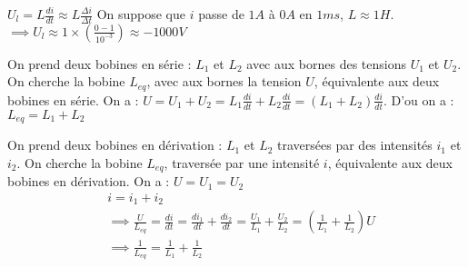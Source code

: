 \begin{center}
\end{center}

\begin{corollary}[Remarque]\label{rem: Rupture du courrant}
    \(U_{l} = L\frac{di}{dt} \approx L \frac{\Delta i}{\Delta t}\) On suppose que \(i\) passe de \(1A\) à \(0A\) en \(1ms\), \(L \approx 1H\). \\
    \( \implies U_{l} \approx 1 \times (\frac{0-1}{10^{-3}}) \approx -1000V \)   
\end{corollary}

\begin{corollary}
    On prend deux bobines en série : \(L_{1}\) et \(L_{2}\) avec aux bornes des tensions \(U_{1}\) et \(U_{2}\). On cherche la bobine \(L_{eq}\), avec aux bornes la tension \(U\), équivalente aux deux bobines en série. On a : \(U = U_{1} + U_{2} = L_{1} \frac{di}{dt}+ L_{2} \frac{di}{dt} = (L_{1}+L_{2})\frac{di}{dt}\). D'ou on a : \(L_{eq} = L_{1}+L_{2}\)    
\end{corollary}

\begin{corollary}
    On prend deux bobines en dérivation : \(L_{1}\) et \(L_{2}\) traversées par des intensités \(i_{1}\) et \(i_{2}\). On cherche la bobine \(L_{eq}\), traversée par une intensité \(i\), équivalente aux deux bobines en dérivation. On a : \(U = U_{1} = U_{2}\) 
    \begin{eqnarray*}
       &i = i_{1} + i_{2} \\
       &\implies \frac{U}{L_{eq}} = \frac{di}{dt} = \frac{d i_{1}}{dt} + \frac{d i_{2}}{dt} = \frac{U_{1}}{L_{1}} + \frac{U_{2}}{L_{2}} = (\frac{1}{L_{1}} + \frac{1}{L_{2}})U\\
       &\implies \frac{1}{L_{eq}} = \frac{1}{L_{1}} + \frac{1}{L_{2}}
    \end{eqnarray*}     
\end{corollary}
